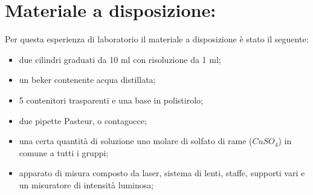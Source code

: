 \section{Materiale a disposizione:}

Per questa esperienza di laboratorio il materiale a disposizione è stato il seguente:
\begin{itemize}
	\item{due cilindri graduati da 10 $\si{\milli\litre}$ con risoluzione da 1 $\si{\milli\litre}$;}
    \item{un beker contenente acqua distillata;}
	\item{5 contenitori trasparenti e una base in polistirolo;}
	\item{due pipette Pasteur, o contagocce;}
	\item{una certa quantità di soluzione uno molare di solfato di rame ($CuSO_4$) in comune a tutti i gruppi;}
	\item{apparato di misura composto da laser, sistema di lenti, staffe, supporti vari e un misuratore di intensità luminosa;}
\end{itemize}

